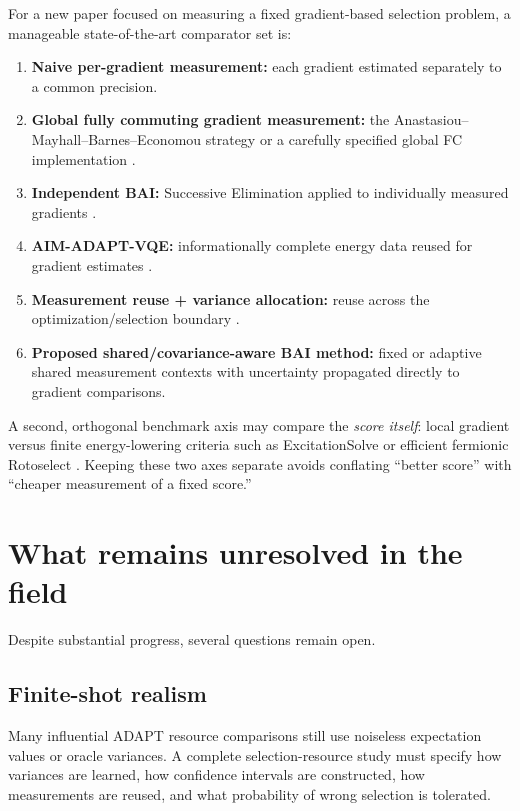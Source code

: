 \documentclass[11pt]{article}
\begin{document}
For a new paper focused on measuring a fixed gradient-based selection problem, a manageable state-of-the-art comparator set is:
\begin{enumerate}[leftmargin=2em]
    \item \textbf{Naive per-gradient measurement:} each gradient estimated separately to a common precision.
    \item \textbf{Global fully commuting gradient measurement:} the Anastasiou--Mayhall--Barnes--Economou strategy or a carefully specified global FC implementation \cite{Anastasiou2023}.
    \item \textbf{Independent BAI:} Successive Elimination applied to individually measured gradients \cite{Huang2026}.
    \item \textbf{AIM-ADAPT-VQE:} informationally complete energy data reused for gradient estimates \cite{Nykanen2025}.
    \item \textbf{Measurement reuse + variance allocation:} reuse across the optimization/selection boundary \cite{Ikhtiarudin2025}.
    \item \textbf{Proposed shared/covariance-aware BAI method:} fixed or adaptive shared measurement contexts with uncertainty propagated directly to gradient comparisons.
\end{enumerate}
A second, orthogonal benchmark axis may compare the \emph{score itself}: local gradient versus finite energy-lowering criteria such as ExcitationSolve or efficient fermionic Rotoselect \cite{Jager2025,Rossi2026}. Keeping these two axes separate avoids conflating ``better score'' with ``cheaper measurement of a fixed score.''

\section{What remains unresolved in the field}

Despite substantial progress, several questions remain open.

\subsection{Finite-shot realism}
Many influential ADAPT resource comparisons still use noiseless expectation values or oracle variances. A complete selection-resource study must specify how variances are learned, how confidence intervals are constructed, how measurements are reused, and what probability of wrong selection is tolerated.
\end{document}
